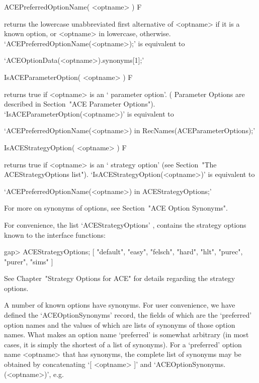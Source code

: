 \>ACEPreferredOptionName( <optname> ) F

returns the lowercase unabbreviated first alternative of <optname>  if
it is a known {\ACE} option, or  <optname>  in  lowercase,  otherwise.
`ACEPreferredOptionName(<optname>);' is equivalent to

\beginitems
\qquad`ACEOptionData(<optname>).synonyms[1];'
\enditems

\>IsACEParameterOption( <optname> ) F

returns true if <optname> is an \lq{}{\ACE} parameter option'. ({\ACE}
Parameter Options are described in Section~"ACE  Parameter  Options").
`IsACEParameterOption(<optname>)' is equivalent to

\beginitems
\qquad`ACEPreferredOptionName(<optname>) in RecNames(ACEParameterOptions);'
\enditems

\>IsACEStrategyOption( <optname> ) F

returns true if <optname> is  an  \lq{}{\ACE}  strategy  option'  (see
Section~"The                ACEStrategyOptions                 list").
`IsACEStrategyOption(<optname>)' is equivalent to

\beginitems
\qquad`ACEPreferredOptionName(<optname>) in ACEStrategyOptions;'
\enditems

For more on  synonyms  of  {\ACE}  options,  see  Section~"ACE  Option
Synonyms".

\enditems


For  convenience,  the  {\GAP}  list  `ACEStrategyOptions'{\undoquotes
{}},   contains   the
strategy options known to the {\ACE} interface functions:

\beginexample
gap> ACEStrategyOptions;
[ "default", "easy", "felsch", "hard", "hlt", "purec", "purer", "sims" ]
\endexample

See Chapter~"Strategy Options  for  ACE"  for  details  regarding  the
{\ACE} strategy options.


A number of known {\ACE} options have synonyms. For user  convenience,
we     have      defined      the      `ACEOptionSynonyms'{\undoquotes
{}} record, the  fields
of which are the \lq{}preferred' option names and the values of  which
are lists of synonyms of those option names. What makes an option name
\lq{}preferred' is somewhat arbitrary (in most cases, it is simply the
shortest of a list of synonyms). For  a  \lq{}preferred'  option  name
<optname> that has synonyms, the complete  list  of  synonyms  may  be
obtained     by     concatenating     `[     <optname>     ]'      and
`ACEOptionSynonyms.(<optname>)', e.g.

